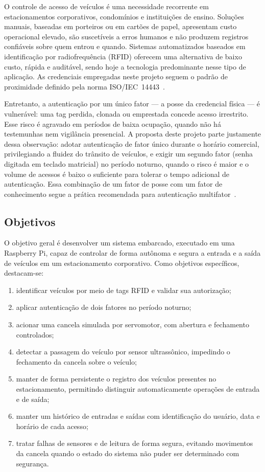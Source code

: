 \documentclass[11pt,a4paper]{article}
\begin{document}
O controle de acesso de veículos é uma necessidade recorrente em estacionamentos
corporativos, condomínios e instituições de ensino. Soluções manuais, baseadas em
porteiros ou em cartões de papel, apresentam custo operacional elevado, são
suscetíveis a erros humanos e não produzem registros confiáveis sobre quem entrou
e quando. Sistemas automatizados baseados em identificação por radiofrequência
(RFID) oferecem uma alternativa de baixo custo, rápida e auditável, sendo hoje a
tecnologia predominante nesse tipo de aplicação. As credenciais empregadas neste
projeto seguem o padrão de proximidade definido pela norma
ISO/IEC~14443~\cite{iso14443}.

Entretanto, a autenticação por um único fator --- a posse da credencial física ---
é vulnerável: uma tag perdida, clonada ou emprestada concede acesso irrestrito.
Esse risco é agravado em períodos de baixa ocupação, quando não há testemunhas
nem vigilância presencial. A proposta deste projeto parte justamente dessa
observação: adotar autenticação de fator único durante o horário comercial,
privilegiando a fluidez do trânsito de veículos, e exigir um segundo fator
(senha digitada em teclado matricial) no período noturno, quando o risco é maior
e o volume de acessos é baixo o suficiente para tolerar o tempo adicional de
autenticação. Essa combinação de um fator de posse com um fator de conhecimento
segue a prática recomendada para autenticação multifator~\cite{nistmfa}.

\subsection{Objetivos}

O objetivo geral é desenvolver um sistema embarcado, executado em uma Raspberry
Pi, capaz de controlar de forma autônoma e segura a entrada e a saída de veículos
em um estacionamento corporativo. Como objetivos específicos, destacam-se:

\begin{enumerate}[itemsep=1pt]
  \item identificar veículos por meio de tags RFID e validar sua autorização;
  \item aplicar autenticação de dois fatores no período noturno;
  \item acionar uma cancela simulada por servomotor, com abertura e fechamento
        controlados;
  \item detectar a passagem do veículo por sensor ultrassônico, impedindo o
        fechamento da cancela sobre o veículo;
  \item manter de forma persistente o registro dos veículos presentes no
        estacionamento, permitindo distinguir automaticamente operações de
        entrada e de saída;
  \item manter um histórico de entradas e saídas com identificação do usuário,
        data e horário de cada acesso;
  \item tratar falhas de sensores e de leitura de forma segura, evitando
        movimentos da cancela quando o estado do sistema não puder ser
        determinado com segurança.
\end{enumerate}
\end{document}
